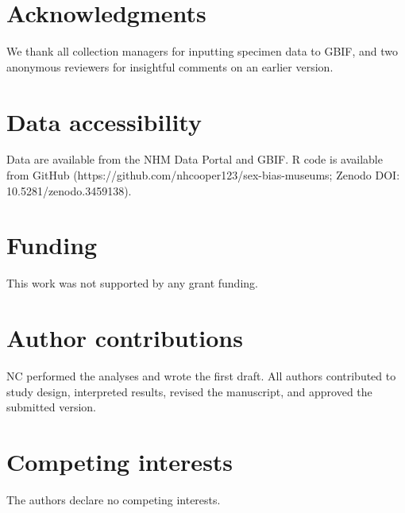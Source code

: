 \documentclass[a4paper, 12pt]{article}
\begin{document}
\section{Acknowledgments}
We thank all collection managers for inputting specimen data to GBIF, and two anonymous reviewers for insightful comments on an earlier version.

\section{Data accessibility}\label{data-code-and-materials}
Data are available from the NHM Data Portal \cite{sex-bias-data} and GBIF\cite{gbif}. 
R code is available from GitHub (https://github.com/nhcooper123/sex-bias-museums; Zenodo DOI: 10.5281/zenodo.3459138).

\section{Funding}
This work was not supported by any grant funding.




\section{Author contributions}
NC performed the analyses and wrote the first draft. All authors contributed to study design, interpreted results, revised the manuscript, and approved the submitted version.

\section{Competing interests}
The authors declare no competing interests.
\end{document}
